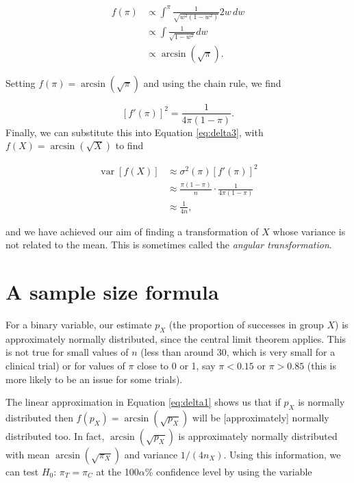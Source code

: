 \documentclass[
  openany]{book}
\theoremstyle{definition}
\theoremstyle{definition}
\theoremstyle{definition}
\theoremstyle{definition}
\theoremstyle{remark}
\begin{document}
\begin{align*}
f\left(\pi\right) & \propto \int^\pi{\frac{1}{\sqrt{w^2\left(1-w^2\right)}}2w\,dw}\\
&\propto \int{\frac{1}{\sqrt{1 - w^2}}}dw\\
& \propto \arcsin{\left(\sqrt{\pi}\right)}.
\end{align*}

Setting \(f\left(\pi\right) = \arcsin\left(\sqrt{\pi}\right)\) and using the chain rule, we find

\[\left[f'\left(\pi\right)\right]^2 = \frac{1}{4\pi\left(1-\pi\right)} .\]
Finally, we can substitute this into Equation \eqref{eq:delta3}, with \(f\left(X\right) = \arcsin\left(\sqrt{X}\right)\) to find

\begin{align*}
  \operatorname{var}\left[f\left(X\right)\right] & \approx \sigma^2\left(\pi\right)\left[f'\left(\pi\right)\right]^2  \\
& \approx{\frac{\pi\left(1-\pi\right)}{n}\cdot\frac{1}{4\pi\left(1-\pi\right)}}\\
& \approx{\frac{1}{4n}},
\end{align*}

and we have achieved our aim of finding a transformation of \(X\) whose variance is not related to the mean. This is sometimes called the \emph{angular transformation}.

\section{A sample size formula}\label{a-sample-size-formula}

For a binary variable, our estimate \(p_X\) (the proportion of successes in group \(X\)) is approximately normally distributed, since the central limit theorem applies. This is not true for small values of \(n\) (less than around 30, which is very small for a clinical trial) or for values of \(\pi\) close to 0 or 1, say \(\pi<0.15\) or \(\pi>0.85\) (this is more likely to be an issue for some trials).

The linear approximation in Equation \eqref{eq:delta1} shows us that if \(p_X\) is normally distributed then \(f\left(p_X\right) = \arcsin\left(\sqrt{p_X}\right)\) will be {[}approximately{]} normally distributed too. In fact, \(\arcsin\left(\sqrt{p_X}\right)\) is approximately normally distributed with mean \(\arcsin{\left(\sqrt{\pi_X}\right)}\) and variance \(1/\left(4n_X\right)\). Using this information, we can test \(H_0:\,\pi_T =\pi_C\) at the 100\(\alpha\)\% confidence level by using the variable
\end{document}
